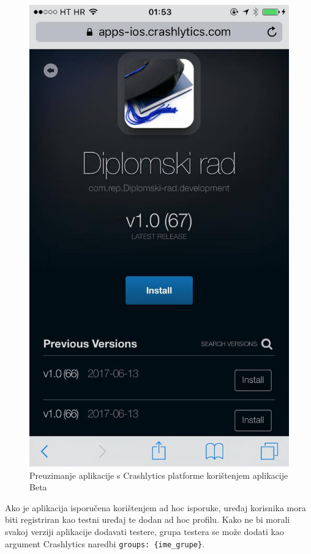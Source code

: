 \documentclass[times, utf8, diplomski, numeric]{fer}
\begin{document}
\begin{figure}[h!]
\centering
\includegraphics[scale=0.3]{Beta}
\caption{Preuzimanje aplikacije s Crashlytics platforme korištenjem aplikacije Beta}
\label{fig:Beta}
\end{figure}

Ako je aplikacija isporučena korištenjem ad hoc isporuke, uređaj korisnika mora biti registriran kao testni uređaj te dodan ad hoc profilu. Kako ne bi morali svakoj verziji aplikacije dodavati testere, grupa testera se može dodati kao argument Crashlytics naredbi \verb|groups: {ime_grupe}|.
\end{document}
